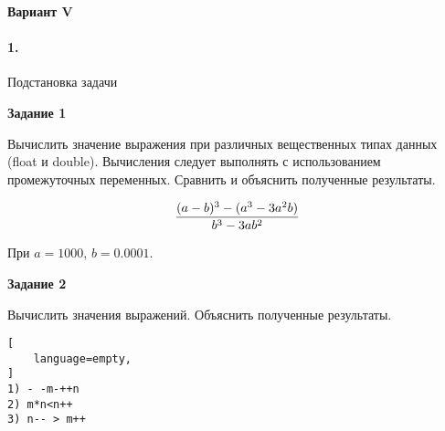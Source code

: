 \begin{center}
    \textbf{Вариант V}
\end{center}

\paragraph{1.} Подстановка задачи

\textbf{Задание 1}

Вычислить значение выражения при различных вещественных типах данных (float и double). Вычисления следует выполнять с использованием промежуточных переменных. Сравнить и объяснить полученные результаты.

$$
{ { (a-b)^3 - (a^3 - 3a^2b) } \over { b^3 - 3ab^2 } }
$$

При $a = 1000$, $b = 0.0001$.

\textbf{Задание 2}

Вычислить значения выражений. Объяснить полученные результаты.

\begin{lstlisting}[
    language=empty,
]
1) - -m-++n
2) m*n<n++
3) n-- > m++
\end{lstlisting}